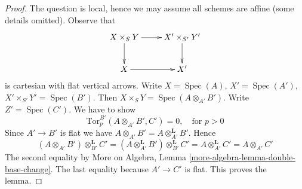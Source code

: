 \documentclass[10pt,a4paper]{amsart}
\theoremstyle{plain}
\theoremstyle{definition}
\theoremstyle{remark}
\numberwithin{equation}{subsection}
\def\Spec{\mathop{\mathrm{Spec}}}
\begin{document}
\begin{proof}
The question is local, hence we may assume all schemes are affine
(some details omitted). Observe that
$$
\xymatrix{
X \times_S Y \ar[r] \ar[d] & X' \times_{S'} Y' \ar[d] \\
X \ar[r] & X'
}
$$
is cartesian with flat vertical arrows.
Write $X = \Spec(A)$, $X' = \Spec(A')$,
$X' \times_{S'} Y' = \Spec(B')$. Then
$X \times_S Y = \Spec(A \otimes_{A'} B')$.
Write $Z' = \Spec(C')$. We have to show
$$
\text{Tor}_p^{B'}(A \otimes_{A'} B', C') = 0,
\quad\text{for } p > 0
$$
Since $A' \to B'$ is flat
we have $A \otimes_{A'} B' = A \otimes_{A'}^\mathbf{L} B'$.
Hence
$$
(A \otimes_{A'} B') \otimes_{B'}^\mathbf{L} C' =
(A \otimes_{A'}^\mathbf{L} B') \otimes_{B'}^\mathbf{L} C' =
A \otimes_{A'}^\mathbf{L} C' =
A \otimes_{A'} C'
$$
The second equality by More on Algebra, Lemma
\ref{more-algebra-lemma-double-base-change}.
The last equality because $A' \to C'$ is flat. This proves the lemma.
\end{proof}
\end{document}
